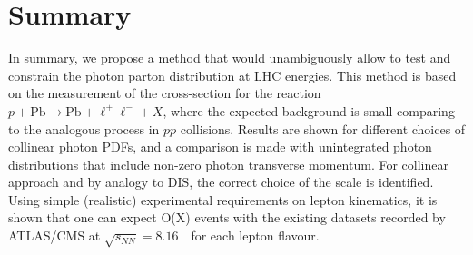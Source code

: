 \section{Summary}

In summary, we propose a method that would unambiguously allow to test and constrain the photon parton distribution at LHC energies.
This method is based on the measurement of the cross-section for the reaction $p+\textrm{Pb}\rightarrow \textrm{Pb} + \ell^+\ell^- + X$, where the expected background is small comparing to the analogous process in $pp$ collisions. 
Results are shown for different choices of collinear photon PDFs, and a comparison is made with unintegrated photon distributions that include non-zero photon transverse momentum.
For collinear approach and  by analogy to DIS, the correct choice of the scale is identified.
Using simple (realistic) experimental requirements on lepton kinematics, it is shown that one can expect O(X) events with the existing datasets recorded by ATLAS/CMS at $\sqrt{s_{N N}} = 8.16$~\TeV\ for each lepton flavour.

